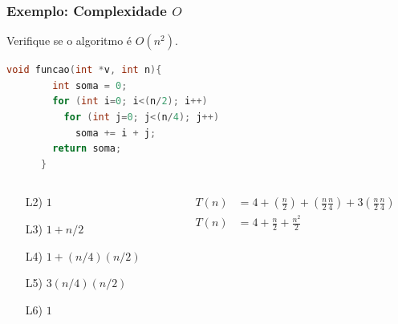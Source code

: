 \documentclass[10pt]{beamer}
\begin{document}
\begin{frame}[fragile, t]
    \frametitle{Exemplo: Complexidade $O$}
    Verifique se o algoritmo é $O(n^2)$.\vfill

    \begin{lstlisting}[language=C++, basicstyle=\small]
      void funcao(int *v, int n){ 
        int soma = 0;
        for (int i=0; i<(n/2); i++) 
          for (int j=0; j<(n/4); j++) 
            soma += i + j;
        return soma;
      } 
  \end{lstlisting}\vfill

    \begin{columns}
        \begin{column}{0.4\textwidth}
            \begin{enumerate}
                \item[L2)] $1$
                \item[L3)] $1 + n/2$
                \item[L4)] $1 + (n/4)(n/2)$
                \item[L5)] $3(n/4)(n/2)$
                \item[L6)] $1$
            \end{enumerate}
        \end{column}
        \begin{column}{0.6\textwidth}
            \begin{align*}
                T(n) & = 4 + \left(\frac{n}{2}\right) + \left(\frac{n}{2}\frac{n}{4}\right) + 3\left(\frac{n}{2}\frac{n}{4}\right) \\
                T(n) & = 4 + \frac{n}{2}+ \frac{n^2}{2}
            \end{align*}

        \end{column}
    \end{columns}

\end{frame}
\end{document}
